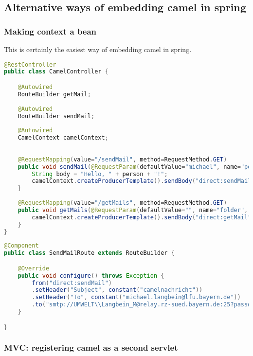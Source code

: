 \subsection{Alternative ways of embedding camel in spring}

\subsubsection{Making context a bean}

This is certainly the easiest way of embedding camel in spring. 

\begin{lstlisting}[language=java]
@RestController
public class CamelController {

	@Autowired
	RouteBuilder getMail;
	
	@Autowired
	RouteBuilder sendMail;
	
	@Autowired
	CamelContext camelContext;
	
	
	@RequestMapping(value="/sendMail", method=RequestMethod.GET)
	public void sendMail(@RequestParam(defaultValue="michael", name="person", required=false) String person) throws Exception {
		String body = "Hello, " + person + "!";
		camelContext.createProducerTemplate().sendBody("direct:sendMail", body);
	}
	
	@RequestMapping(value="/getMails", method=RequestMethod.GET)
	public void getMails(@RequestParam(defaultValue="", name="folder", required=false) String folder) throws Exception {
		camelContext.createProducerTemplate().sendBody("direct:getMail", folder);
	}
}
\end{lstlisting}

\begin{lstlisting}[language=java]
@Component
public class SendMailRoute extends RouteBuilder {

	@Override
	public void configure() throws Exception {
		from("direct:sendMail")
		.setHeader("Subject", constant("camelnachricht"))
		.setHeader("To", constant("michael.langbein@lfu.bayern.de"))
		.to("smtp://UMWELT\\Langbein_M@relay.rz-sued.bayern.de:25?password=michael86&from=alarmplaene@lfu.bayern.de");
	}

}
\end{lstlisting}

\subsubsection{MVC: registering camel as a second servlet}

